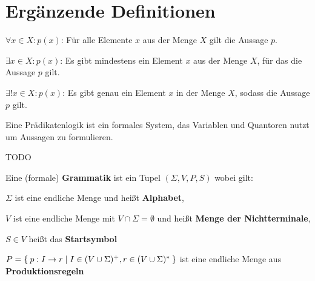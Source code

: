 \chapter*{Ergänzende Definitionen}

\begin{definition}[Quantoren]%
	\begin{defenum}
		\item $\forall x \in X: p(x)$: Für alle Elemente $x$ aus der Menge $X$ gilt
		die Aussage $p$.
		\item $\exists x \in X: p(x)$: Es gibt mindestens ein Element $x$ aus der
		Menge $X$, für das die Aussage $p$ gilt.
		\item $\exists! x \in X: p(x)$: Es gibt genau ein Element $x$ in der
		Menge $X$, sodass die Aussage $p$ gilt.
	\end{defenum}
\end{definition}

\begin{definition}[Prädikatenlogik]%
	Eine Prädikatenlogik ist ein formales System, das Variablen und Quantoren
	nutzt um Aussagen zu formulieren.
\end{definition}

\begin{definition}[Aussagenlogik]%
	TODO
\end{definition}

\begin{definition}[Grammatik]%
	Eine (formale) \textbf{Grammatik} ist ein Tupel $(\Sigma, V, P, S)$ wobei gilt:
	\begin{defenumprops}
		\item $\Sigma$ ist eine endliche Menge und heißt \textbf{Alphabet},
		\item $V$ ist eine endliche Menge mit $V \cap \Sigma = \emptyset$ und
		      heißt \textbf{Menge der Nichtterminale},
		\item $S \in V$ heißt das \textbf{Startsymbol}
		\item $P = \Set{p: I \rightarrow r | I \in (V \cup \Sigma)^+, r \in (V \cup \Sigma)^*}$ ist eine endliche Menge aus \textbf{Produktionsregeln}
	\end{defenumprops}
\end{definition}

